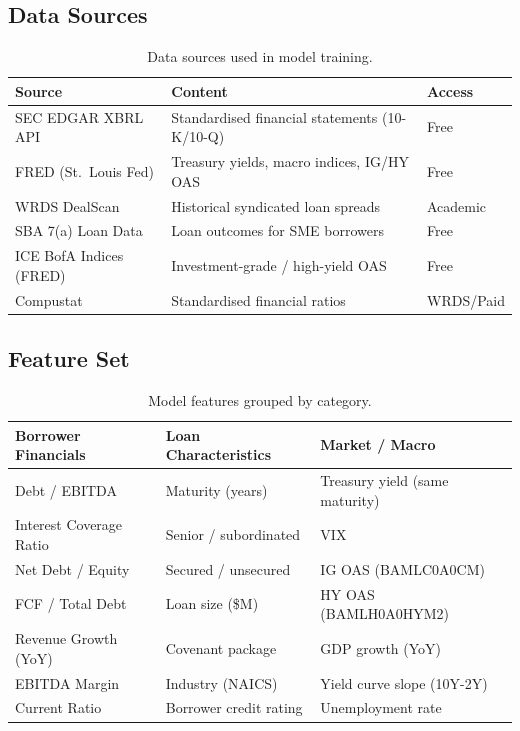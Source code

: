 \documentclass[12pt, a4paper]{article}
\theoremstyle{definition}
\begin{document}
\subsection{Data Sources}

\begin{table}[H]
\centering
\caption{Data sources used in model training.}
\label{tab:data}
\begin{tabular}{p{4cm} p{5.5cm} p{3.5cm}}
\toprule
\textbf{Source} & \textbf{Content} & \textbf{Access} \\
\midrule
SEC EDGAR XBRL API       & Standardised financial statements (10-K/10-Q) & Free \\
FRED (St.\ Louis Fed)    & Treasury yields, macro indices, IG/HY OAS      & Free \\
WRDS DealScan            & Historical syndicated loan spreads              & Academic \\
SBA 7(a) Loan Data       & Loan outcomes for SME borrowers                 & Free \\
ICE BofA Indices (FRED)  & Investment-grade / high-yield OAS               & Free \\
Compustat                & Standardised financial ratios                   & WRDS/Paid \\
\bottomrule
\end{tabular}
\end{table}

\subsection{Feature Set}

\begin{table}[H]
\centering
\caption{Model features grouped by category.}
\label{tab:features}
\begin{tabular}{p{3.5cm} p{4cm} p{4cm}}
\toprule
\textbf{Borrower Financials} & \textbf{Loan Characteristics} & \textbf{Market / Macro} \\
\midrule
Debt / EBITDA & Maturity (years) & Treasury yield (same maturity) \\
Interest Coverage Ratio & Senior / subordinated & VIX \\
Net Debt / Equity & Secured / unsecured & IG OAS (BAMLC0A0CM) \\
FCF / Total Debt & Loan size (\$M) & HY OAS (BAMLH0A0HYM2) \\
Revenue Growth (YoY) & Covenant package & GDP growth (YoY) \\
EBITDA Margin & Industry (NAICS) & Yield curve slope (10Y-2Y) \\
Current Ratio & Borrower credit rating & Unemployment rate \\
\bottomrule
\end{tabular}
\end{table}
\end{document}
